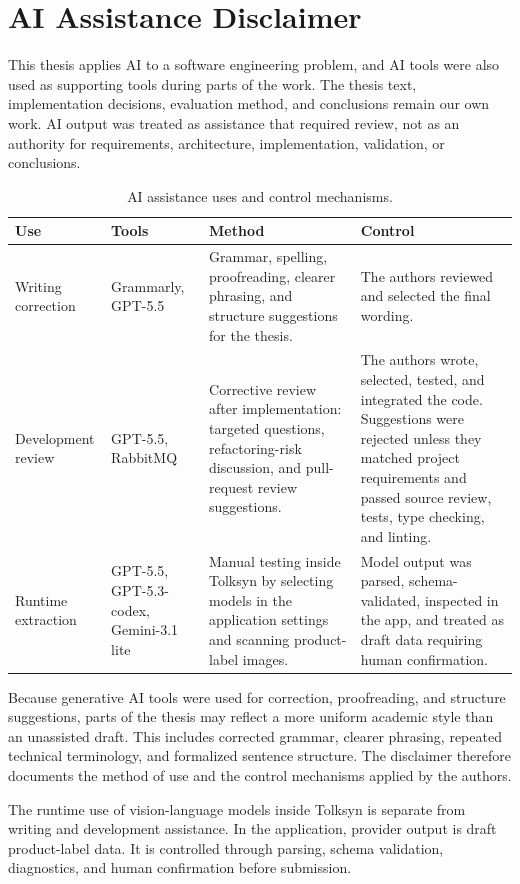 \chapter*{AI Assistance Disclaimer}

This thesis applies AI to a software engineering problem, and AI tools were also used as supporting tools during parts of the work. The thesis text, implementation decisions, evaluation method, and conclusions remain our own work. AI output was treated as assistance that required review, not as an authority for requirements, architecture, implementation, validation, or conclusions.

\begin{table}[htbp]
\footnotesize
\centering
\begin{tabularx}{\textwidth}{P{0.20\textwidth}P{0.23\textwidth}YY}
\toprule
\textbf{Use} & \textbf{Tools} & \textbf{Method} & \textbf{Control} \\
\midrule
Writing correction & Grammarly, GPT-5.5 & Grammar, spelling, proofreading, clearer phrasing, and structure suggestions for the thesis. & The authors reviewed and selected the final wording. \\
Development review & GPT-5.5, RabbitMQ & Corrective review after implementation: targeted questions, refactoring-risk discussion, and pull-request review suggestions. & The authors wrote, selected, tested, and integrated the code. Suggestions were rejected unless they matched project requirements and passed source review, tests, type checking, and linting. \\
Runtime extraction & GPT-5.5, GPT-5.3-codex, Gemini-3.1 lite & Manual testing inside Tolksyn by selecting models in the application settings and scanning product-label images. & Model output was parsed, schema-validated, inspected in the app, and treated as draft data requiring human confirmation. \\
\bottomrule
\end{tabularx}
\caption{AI assistance uses and control mechanisms.}
\end{table}

Because generative AI tools were used for correction, proofreading, and structure suggestions, parts of the thesis may reflect a more uniform academic style than an unassisted draft. This includes corrected grammar, clearer phrasing, repeated technical terminology, and formalized sentence structure. The disclaimer therefore documents the method of use and the control mechanisms applied by the authors.

The runtime use of vision-language models inside Tolksyn is separate from writing and development assistance. In the application, provider output is draft product-label data. It is controlled through parsing, schema validation, diagnostics, and human confirmation before submission.
